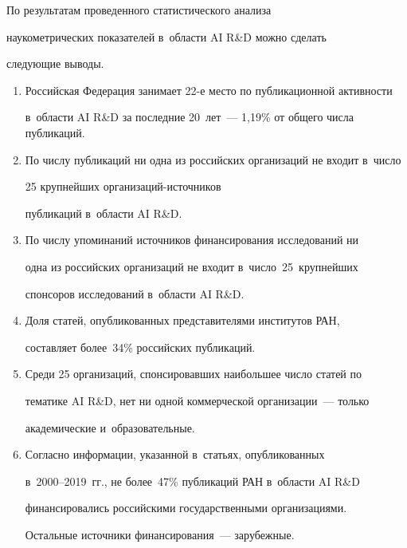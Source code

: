  


 По результатам проведенного статистического анализа 


наукометрических показателей в~области AI R\&D можно сделать 


следующие выводы.


 \begin{enumerate}[1.]


\item Российская Федерация занимает 22-е место по публикационной активности 


в~области AI R\&D за последние 20~лет~--- 1,19\% от общего числа публикаций.\\[-13pt]


\item По числу публикаций ни одна из российских организаций не входит в~число 


25 крупнейших ор\-га\-ни\-за\-ций-ис\-точ\-ни\-ков


пуб\-ли\-ка\-ций в~об\-ласти AI R\&D.\\[-13pt]


\item По числу упоминаний источников финансирования исследований ни 


одна из российских организаций не входит в~число~25~крупнейших 


спонсоров исследований в~области AI R\&D.\\[-13pt]


\item Доля статей, опубликованных представителями институтов РАН, 


составляет более~34\% российских публикаций.\\[-13pt]


\item Среди 25 организаций, спонсировавших наибольшее число статей по 


тематике AI R\&D, нет ни одной коммерческой организации~--- только 


академические и~образовательные.\\[-13pt]


\item Согласно информации, указанной в~статьях, опубликованных


в~2000--2019~гг., не более~47\% публикаций РАН в~области AI R\&D 


финансировались российскими государственными организациями. 


Остальные источники финансирования~--- зарубежные.\\[-13pt]



\end{enumerate}
